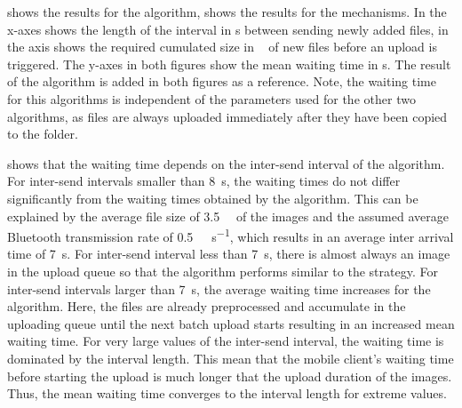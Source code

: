  shows the results for the \algointerval algorithm,  shows the results for the \algosize mechanisms. 
In  the x-axes shows the length of the interval in \si{\second} between sending newly added files, in  the axis shows the required cumulated size in \si{\mega\byte} of new files before an upload is triggered.
The y-axes in both figures show the mean waiting time \sojournTime in \si{\second}.
The result of the \algoimmediate algorithm is added in both figures as a reference.
Note, the waiting time for this algorithms is independent of the parameters used for the other two algorithms, as files are always uploaded immediately after they have been copied to the \dropbox folder.

 shows that the waiting time depends on the inter-send interval of the \algointerval algorithm. 
For inter-send intervals smaller than \SI{8}{\second}, the waiting times do not differ significantly from the waiting times obtained by the \algoimmediate algorithm.
This can be explained by the average file size of \SI{3.5}{\mega\byte} of the images and the assumed average Bluetooth transmission rate of \SI{0.5}{\mega\bit\per\second}, which results in an average inter arrival time of \SI{7}{\second}.
For inter-send interval less than \SI{7}{\second}, there is almost always an image in the upload queue so that the algorithm performs similar to the \algoimmediate strategy. 
For inter-send intervals larger than \SI{7}{\second}, the average waiting time increases for the \algointerval algorithm.
Here, the files are already preprocessed and accumulate in the uploading queue until the next batch upload starts resulting in an increased mean waiting time.
For very large values of the inter-send interval, the waiting time is dominated by the interval length.
This mean that the mobile client's waiting time before starting the upload is much longer that the upload duration of the images.
Thus, the mean waiting time converges to the interval length for extreme values.

